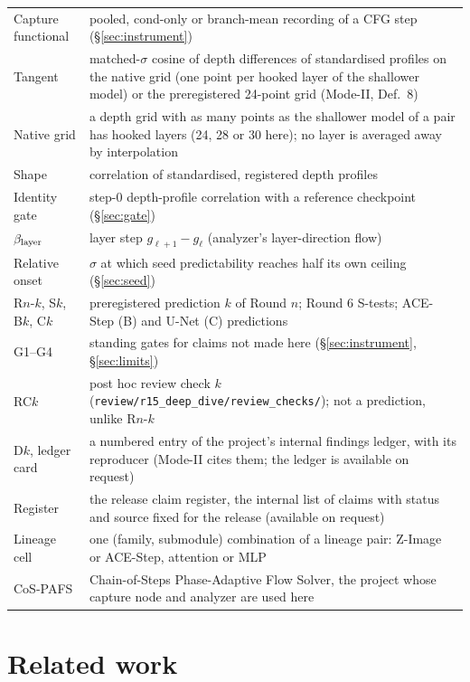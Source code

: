 \documentclass[11pt]{article}
\begin{document}
{\begin{tabularx}{\linewidth}{@{}lL@{}}
Capture functional & pooled, cond-only or branch-mean recording of a CFG step (\S\ref{sec:instrument})\\
Tangent & matched-$\sigma$ cosine of depth differences of standardised profiles on the native grid (one point per hooked layer of the shallower model) or the preregistered 24-point grid (Mode-II, Def.~8)\\Native grid & a depth grid with as many points as the shallower model of a pair has hooked layers (24, 28 or 30 here); no layer is averaged away by interpolation\\
Shape & correlation of standardised, registered depth profiles\\
Identity gate & step-0 depth-profile correlation with a reference checkpoint (\S\ref{sec:gate})\\
$\beta_{\rm layer}$ & layer step $g_{\ell+1}-g_\ell$ (analyzer's layer-direction flow)\\
Relative onset & $\sigma$ at which seed predictability reaches half its own ceiling (\S\ref{sec:seed})\\
R$n$-$k$, S$k$, B$k$, C$k$ & preregistered prediction $k$ of Round $n$; Round 6 S-tests; ACE-Step (B) and U-Net (C) predictions\\
G1--G4 & standing gates for claims not made here (\S\ref{sec:instrument}, \S\ref{sec:limits})\\
RC$k$ & post hoc review check $k$ (\texttt{review/r15\_deep\_dive/review\_checks/}); not a prediction, unlike R$n$-$k$\\
D$k$, ledger card & a numbered entry of the project's internal findings ledger, with its reproducer (Mode-II cites them; the ledger is available on request)\\
Register & the release claim register, the internal list of claims with status and source fixed for the release (available on request)\\
Lineage cell & one (family, submodule) combination of a lineage pair: Z-Image or ACE-Step, attention or MLP\\
CoS-PAFS & Chain-of-Steps Phase-Adaptive Flow Solver, the project whose capture node and analyzer are used here\\
\bottomrule
\end{tabularx}
}

\section{Related work}\label{sec:related}
\end{document}
